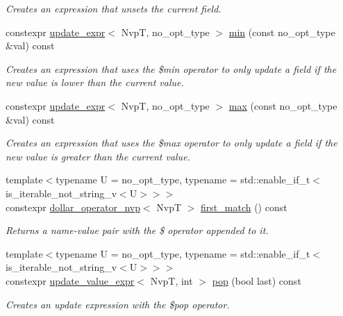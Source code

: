 \begin{DoxyCompactItemize}
\begin{DoxyCompactList}\small\item\em Creates an expression that unsets the current field. \end{DoxyCompactList}\item 
constexpr \hyperlink{classmangrove_1_1update__expr}{update\+\_\+expr}$<$ NvpT, no\+\_\+opt\+\_\+type $>$ \hyperlink{classmangrove_1_1nvp__base_a749ecb4d139aea530a7ecc4075d98187}{min} (const no\+\_\+opt\+\_\+type \&val) const 
\begin{DoxyCompactList}\small\item\em Creates an expression that uses the \$min operator to only update a field if the new value is lower than the current value. \end{DoxyCompactList}\item 
constexpr \hyperlink{classmangrove_1_1update__expr}{update\+\_\+expr}$<$ NvpT, no\+\_\+opt\+\_\+type $>$ \hyperlink{classmangrove_1_1nvp__base_a6e02c07ddd8494336583b38612cc0090}{max} (const no\+\_\+opt\+\_\+type \&val) const 
\begin{DoxyCompactList}\small\item\em Creates an expression that uses the \$max operator to only update a field if the new value is greater than the current value. \end{DoxyCompactList}\item 
{\footnotesize template$<$typename U  = no\+\_\+opt\+\_\+type, typename  = std\+::enable\+\_\+if\+\_\+t$<$is\+\_\+iterable\+\_\+not\+\_\+string\+\_\+v$<$\+U$>$$>$$>$ }\\constexpr \hyperlink{classmangrove_1_1dollar__operator__nvp}{dollar\+\_\+operator\+\_\+nvp}$<$ NvpT $>$ \hyperlink{classmangrove_1_1nvp__base_aa4d2b5c0930914b4a2b202b825282925}{first\+\_\+match} () const 
\begin{DoxyCompactList}\small\item\em Returns a name-\/value pair with the \$ operator appended to it. \end{DoxyCompactList}\item 
{\footnotesize template$<$typename U  = no\+\_\+opt\+\_\+type, typename  = std\+::enable\+\_\+if\+\_\+t$<$is\+\_\+iterable\+\_\+not\+\_\+string\+\_\+v$<$\+U$>$$>$$>$ }\\constexpr \hyperlink{classmangrove_1_1update__value__expr}{update\+\_\+value\+\_\+expr}$<$ NvpT, int $>$ \hyperlink{classmangrove_1_1nvp__base_acc971cd488bb53dec77d298329fae501}{pop} (bool last) const 
\begin{DoxyCompactList}\small\item\em Creates an update expression with the \$pop operator. \end{DoxyCompactList}\item 

\end{DoxyCompactItemize}
